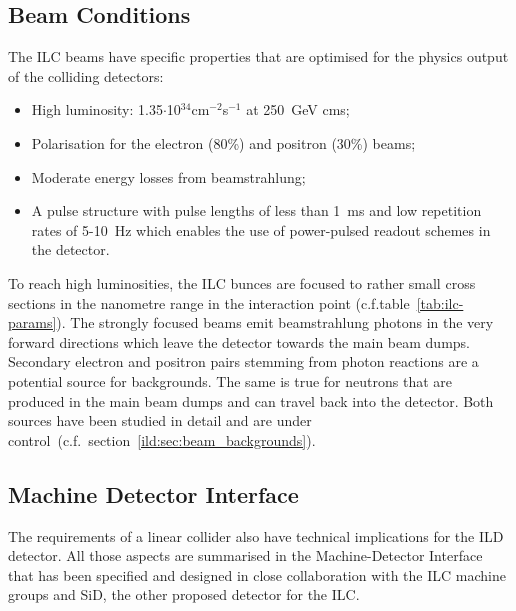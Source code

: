 \subsection{Beam Conditions}
The ILC beams have specific properties that are optimised for the physics output of the colliding detectors:
\begin{itemize}
\item High luminosity: 1.35$\cdot$10$^{34}$cm$^{-2}$s$^{-1}$ at 250~GeV cms;
\item Polarisation for the electron (80\%) and positron (30\%) beams;
\item Moderate energy losses from beamstrahlung;
\item A pulse structure with pulse lengths of less than 1~ms and low repetition rates of 5-10~Hz which enables the use of power-pulsed readout schemes in the detector.
\end{itemize}
To reach high luminosities, the ILC bunces are focused to rather small cross sections in the nanometre range in the interaction point (c.f.table~\ref{tab:ilc-params}). The strongly focused beams emit beamstrahlung photons in the very forward directions which leave the detector towards the main beam dumps. Secondary electron and positron pairs stemming from photon reactions are a potential source for backgrounds. The same is true for neutrons that are produced in the main beam dumps and can travel back into the detector. Both sources have been studied in detail and are under control~(c.f.~section~\ref{ild:sec:beam_backgrounds}).

\subsection{Machine Detector Interface}
The requirements of a linear collider also have technical implications for the ILD detector. All those aspects are summarised in the Machine-Detector Interface that has been specified and designed in close collaboration with the ILC machine groups and SiD, the other proposed detector for the ILC.
